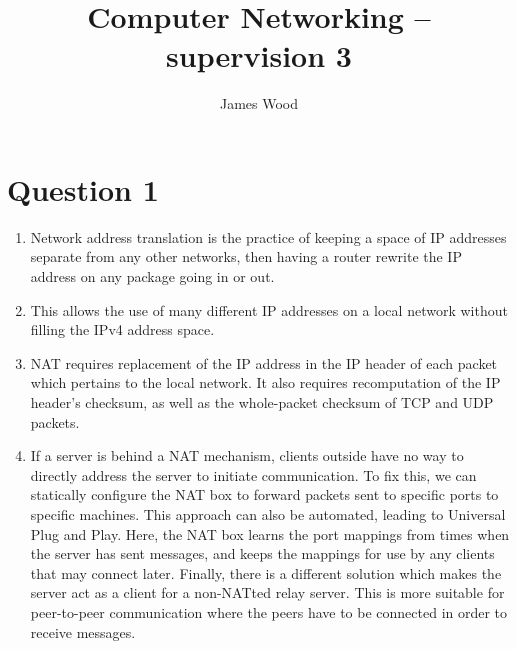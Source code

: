 \documentclass{article}
\begin{document}
\title{Computer Networking -- supervision 3}
\author{James Wood}
\maketitle

\section*{Question 1}
\begin{enumerate}
  \item Network address translation is the practice of keeping a space of IP addresses separate from any other networks, then having a router rewrite the IP address on any package going in or out.
  \item This allows the use of many different IP addresses on a local network without filling the IPv4 address space.
  \item NAT requires replacement of the IP address in the IP header of each packet which pertains to the local network. It also requires recomputation of the IP header's checksum, as well as the whole-packet checksum of TCP and UDP packets.
  \item If a server is behind a NAT mechanism, clients outside have no way to directly address the server to initiate communication. To fix this, we can statically configure the NAT box to forward packets sent to specific ports to specific machines. This approach can also be automated, leading to Universal Plug and Play. Here, the NAT box learns the port mappings from times when the server has sent messages, and keeps the mappings for use by any clients that may connect later. Finally, there is a different solution which makes the server act as a client for a non-NATted relay server. This is more suitable for peer-to-peer communication where the peers have to be connected in order to receive messages.
\end{enumerate}
\end{document}
